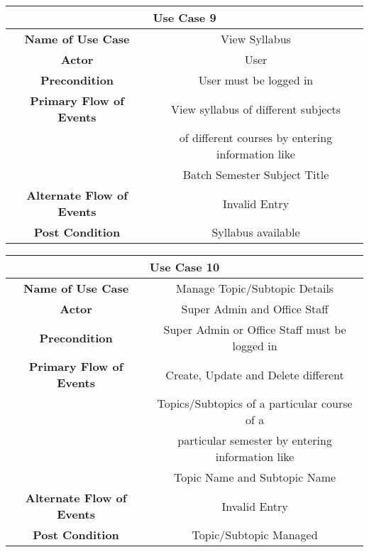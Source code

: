 \vspace{1cm}
\begin{center}
    \begin{tabular}{|c|c|}
        \hline
        \multicolumn{2}{|c|}{Use Case 9} \\
        \hline
        \textbf{Name of Use Case} & View Syllabus \\
        \hline
        \textbf{Actor} & User \\
        \hline
        \textbf{Precondition} & User must be logged in \\
        \hline
        \textbf{Primary Flow of Events} & View syllabus of different subjects \\
        & of different courses by entering information like \\
        & Batch Semester Subject Title \\
        \hline
        \textbf{Alternate Flow of Events} & Invalid Entry \\
        \hline
        \textbf{Post Condition} & Syllabus available \\
        \hline
    \end{tabular}
\end{center}

\vspace{1cm}
\begin{center}
    \begin{tabular}{|c|c|}
        \hline
        \multicolumn{2}{|c|}{Use Case 10} \\
        \hline
        \textbf{Name of Use Case} & Manage Topic/Subtopic Details \\
        \hline
        \textbf{Actor} & Super Admin and Office Staff \\
        \hline
        \textbf{Precondition} & Super Admin or Office Staff must be logged in \\
        \hline
        \textbf{Primary Flow of Events} & Create, Update and Delete different \\
        & Topics/Subtopics of a particular course of a \\
        & particular semester by entering information like \\
        & Topic Name and Subtopic Name \\
        \hline
        \textbf{Alternate Flow of Events} & Invalid Entry \\
        \hline
        \textbf{Post Condition} & Topic/Subtopic Managed \\
        \hline
    \end{tabular}
\end{center}

